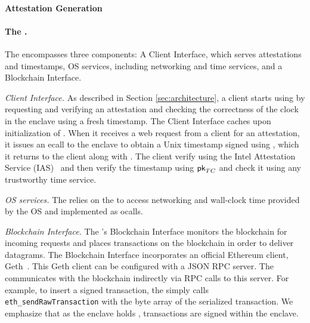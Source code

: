 \paragraph{Attestation Generation} 


\paragraph{The \medname.} The \medname encompasses three components: A Client Interface, which serves attestations and timestamps, OS services, including networking and time services, and a Blockchain Interface. 

\vspace{2mm}

\noindent\emph{Client Interface.} As described in Section \ref{sec:architecture},
a client starts using \tc by requesting and verifying an attestation \att and checking the correctness of the clock in the \tc enclave using a fresh timestamp.
The Client Interface caches \att upon initialization of \engine. When it receives a web request from a client for an attestation,
it issues an ecall to the enclave to obtain a
Unix timestamp signed using \skTC, which it returns to the client along with \att. The client verify \att 
using the Intel Attestation Service (IAS)~\cite{} and then verify the timestamp using ${\sf pk}_{TC}$ and check it using any trustworthy time service. 

\vspace{2mm}

\noindent\emph{OS services.} The \encname relies on the \medname to access networking and 
wall-clock time provided by the OS and implemented as ocalls.

\vspace{2mm}

\noindent\emph{Blockchain Interface.} The \medname's Blockchain Interface monitors the
blockchain for incoming requests and places transactions on the blockchain in order to
deliver datagrams. The Blockchain Interface incorporates an 
official Ethereum client, Geth~\cite{geth}. This Geth client can be configured with a JSON RPC server.  
The \medname  communicates with the blockchain indirectly via RPC calls to this server. For example, to insert a signed transaction, the \medname simply calls
\texttt{eth\_sendRawTransaction} with the byte array of the serialized
transaction. We emphasize that as the enclave holds \skTC, transactions are signed within the enclave.


